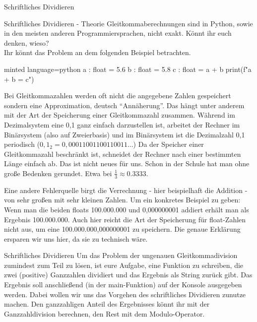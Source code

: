 \begin{task}[points=auto]{Schriftliches Dividieren}
    \begin{subtask*}[points=0]{Schriftliches Dividieren - Theorie }
        Gleitkommaberechnungen sind in Python, sowie in den meisten anderen Programmiersprachen, nicht exakt. Könnt ihr euch denken, wieso?\\
        Ihr könnt das Problem an dem folgenden Beispiel betrachten.
        \begin{codeBlock}[]{minted language=python}
            a : float = 5.6
            b : float = 5.8
            c : float = a + b
            print(f"{a} + {b} = {c}")
        \end{codeBlock}

        \begin{solution}
            Bei Gleitkommazahlen werden oft nicht die angegebene Zahlen gespeichert sondern eine Approximation, deutsch \enquote{Annäherung}. Das hängt unter anderem mit der Art der Speicherung einer Gleitkommazahl zusammen. Während im Dezimalsystem eine 0,1 ganz einfach darzustellen ist, arbeitet der Rechner im Binärsystem (also auf Zweierbasis) und im Binärsystem ist die Dezimalzahl 0,1 periodisch ($0,1_2=0,00011001100110011 \dots$) Da der Speicher einer Gleitkommazahl beschränkt ist, schneidet der Rechner nach einer bestimmten Länge einfach ab.
            Das ist nicht neues für uns. Schon in der Schule hat man ohne
            große Bedenken gerundet. Etwa bei $\frac13 \approx 0.3333$.

            Eine andere Fehlerquelle birgt die Verrechnung - hier beispielhaft die Addition - von sehr großen mit sehr kleinen Zahlen. Um ein konkretes Beispiel zu geben: Wenn man die beiden floats 100.000.000 und 0,000000001 addiert erhält man als Ergebnis 100.000.000. Auch hier reicht die Art der Speicherung für float-Zahlen nicht aus, um eine 100.000.000,000000001 zu speichern. Die genaue Erklärung ersparen wir uns hier, da sie zu technisch wäre.
        \end{solution}
    \end{subtask*}
    \begin{subtask*}[points=0]{Schriftliches Dividieren }
        Um das Problem der ungenauen Gleitkommadivision zumindest zum Teil zu lösen, ist eure Aufgabe, eine Funktion zu schreiben, die zwei (positive) Ganzzahlen dividiert und das Ergebnis als String zurück gibt. Das Ergebnis soll anschließend (in der main-Funktion) auf der Konsole ausgegeben werden. Dabei wollen wir uns das Vorgehen des schriftliches Dividieren zunutze machen. Den ganzzahligen Anteil des Ergebnisses könnt ihr mit der Ganzzahldivision berechnen, den Rest mit dem Modulo-Operator.


\end{subtask*}
\end{task}
